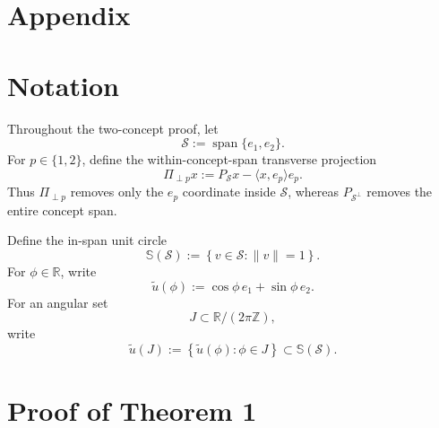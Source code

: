 \documentclass{article} %
\theoremstyle{plain}
\theoremstyle{definition}
\theoremstyle{remark}
\begin{document}



\appendix
\section{Appendix}

\section{Notation}

Throughout the two-concept proof, let
\[
\mathcal S
:=
\operatorname{span}\{e_1,e_2\}.
\]
For $p\in\{1,2\}$, define the within-concept-span transverse projection
\[
\Pi_{\perp p}x
:=
P_{\mathcal S}x
-
\langle x,e_p\rangle e_p.
\]
Thus $\Pi_{\perp p}$ removes only the $e_p$ coordinate inside
$\mathcal S$, whereas $P_{\mathcal S^\perp}$ removes the entire concept
span.

Define the in-span unit circle
\[
\mathbb S(\mathcal S)
:=
\left\{
v\in\mathcal S:
\|v\|=1
\right\}.
\]
For $\phi\in\mathbb R$, write
\[
\widetilde u(\phi)
:=
\cos\phi\,e_1+\sin\phi\,e_2.
\]
For an angular set
\[
J\subset\mathbb R/(2\pi\mathbb Z),
\]
write
\[
\widetilde u(J)
:=
\left\{
\widetilde u(\phi):
\phi\in J
\right\}
\subset
\mathbb S(\mathcal S).
\]

\section{Proof of Theorem 1}

\end{document}
